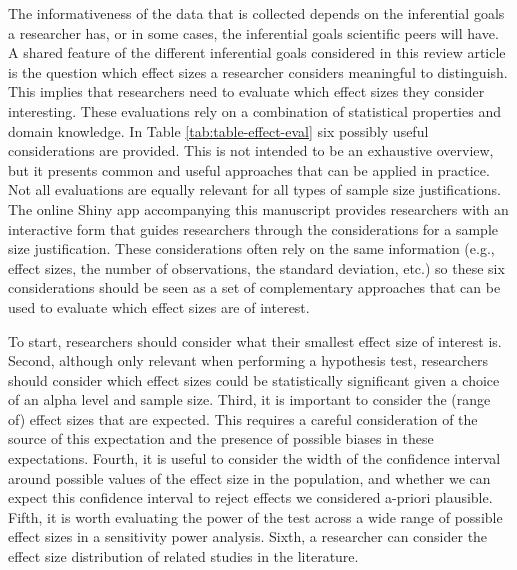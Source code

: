 \documentclass[
  english,
  ,jou,floatsintext]{apa6}
\begin{document}
The informativeness of the data that is collected depends on the inferential goals a researcher has, or in some cases, the inferential goals scientific peers will have. A shared feature of the different inferential goals considered in this review article is the question which effect sizes a researcher considers meaningful to distinguish. This implies that researchers need to evaluate which effect sizes they consider interesting. These evaluations rely on a combination of statistical properties and domain knowledge. In Table \ref{tab:table-effect-eval} six possibly useful considerations are provided. This is not intended to be an exhaustive overview, but it presents common and useful approaches that can be applied in practice. Not all evaluations are equally relevant for all types of sample size justifications. The online Shiny app accompanying this manuscript provides researchers with an interactive form that guides researchers through the considerations for a sample size justification. These considerations often rely on the same information (e.g., effect sizes, the number of observations, the standard deviation, etc.) so these six considerations should be seen as a set of complementary approaches that can be used to evaluate which effect sizes are of interest.

To start, researchers should consider what their smallest effect size of interest is. Second, although only relevant when performing a hypothesis test, researchers should consider which effect sizes could be statistically significant given a choice of an alpha level and sample size. Third, it is important to consider the (range of) effect sizes that are expected. This requires a careful consideration of the source of this expectation and the presence of possible biases in these expectations. Fourth, it is useful to consider the width of the confidence interval around possible values of the effect size in the population, and whether we can expect this confidence interval to reject effects we considered a-priori plausible. Fifth, it is worth evaluating the power of the test across a wide range of possible effect sizes in a sensitivity power analysis. Sixth, a researcher can consider the effect size distribution of related studies in the literature.
\end{document}
